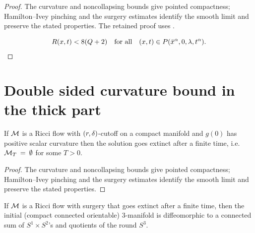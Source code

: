 \begin{proof}
\sketch The curvature and noncollapsing bounds give pointed compactness; Hamilton--Ivey pinching and the surgery estimates identify the smooth limit and preserve the stated properties.
The retained proof uses \cite{Perelman2}.

\begin{equation}
\label{2q+1}
R(x,t)< 8(Q+2)\quad\mbox{for all}\quad (x,t)\in P(\bar x^\alpha,0,\lambda,t^\alpha).
\end{equation}
\end{proof}

\section{Double sided curvature bound in the thick part}
\label{II.6}

\begin{lemma}
  \label{lem:kl-double-sided-curvature-bound-thick-part-compactness-thick-thin-geometry}
 \label{pscempty}
If ${\mathcal M}$ is a Ricci flow with $(r,\delta)$-cutoff on a compact manifold and
$g(0)$ has positive scalar curvature then the solution goes extinct
after a finite time, i.e. ${\mathcal M}_T \: = \: \emptyset$ for some $T > 0$.
\end{lemma}

\begin{proof}
\sketch The curvature and noncollapsing bounds give pointed compactness; Hamilton--Ivey pinching and the surgery estimates identify the smooth limit and preserve the stated properties.
\end{proof}

\begin{lemma}
  \label{lem:kl-double-sided-curvature-bound-thick-part-compactness-ricci-flow-surgery}
 \label{finitetime}
If ${\mathcal M}$ is a Ricci flow with surgery that goes extinct after a finite time,
then the initial (compact connected orientable) $3$-manifold is diffeomorphic to a
connected sum of $S^1 \times S^2$'s and quotients of the round
$S^3$.
\end{lemma}

